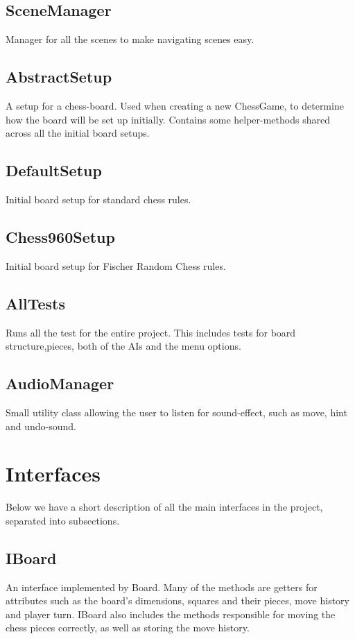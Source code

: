 \documentclass{article}
\begin{document}
\subsection {SceneManager}
Manager for all the scenes to make navigating scenes easy.

\subsection {AbstractSetup}
A setup for a chess-board. Used when creating a new ChessGame, to determine how the board will be set up initially. Contains some helper-methods shared across all the initial board setups.

\subsection {DefaultSetup}
Initial board setup for standard chess rules.

\subsection {Chess960Setup}
Initial board setup for Fischer Random Chess rules.

\subsection {AllTests}
Runs all the test for the entire project. This includes tests for board structure,pieces, both of the AIs and the menu options.

\subsection {AudioManager}
Small utility class allowing the user to listen for sound-effect, such as move, hint and undo-sound.

\section {Interfaces}
Below we have a short description of all the main interfaces in the project, separated into subsections.

\subsection {IBoard}
An interface implemented by Board. Many of the methods are getters for attributes such as the board's dimensions, squares and their pieces, move history and player turn. IBoard also includes the methods responsible for moving the chess pieces correctly, as well as storing the move history.
\end{document}
